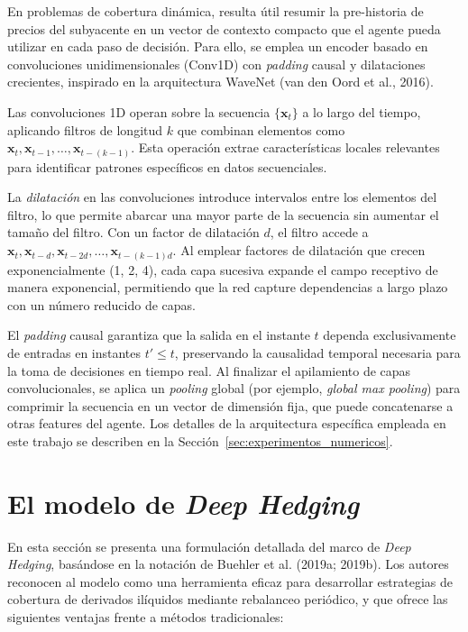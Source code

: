 \documentclass[11pt,a4paper,spanish]{article}
\numberwithin{equation}{section} %
\begin{document}
En problemas de cobertura dinámica, resulta útil resumir la pre-historia de precios del subyacente en un vector de contexto compacto que el agente pueda utilizar en cada paso de decisión. Para ello, se emplea un encoder basado en convoluciones unidimensionales (Conv1D) con \textit{padding} causal y dilataciones crecientes, inspirado en la arquitectura WaveNet (van den Oord et al., 2016).

Las convoluciones 1D operan sobre la secuencia \(\{\mathbf{x}_t\}\) a lo largo del tiempo, aplicando filtros de longitud \(k\) que combinan elementos como \(\mathbf{x}_t, \mathbf{x}_{t-1}, \dots,\allowbreak \mathbf{x}_{t-(k-1)}\). Esta operación extrae características locales relevantes para identificar patrones específicos en datos secuenciales.

La \emph{dilatación} en las convoluciones introduce intervalos entre los elementos del filtro, lo que permite abarcar una mayor parte de la secuencia sin aumentar el tamaño del filtro. Con un factor de dilatación \(d\), el filtro accede a \(\mathbf{x}_t, \mathbf{x}_{t-d}, \mathbf{x}_{t-2d}, \dots, \mathbf{x}_{t-(k-1)d}\). Al emplear factores de dilatación que crecen exponencialmente (1, 2, 4), cada capa sucesiva expande el campo receptivo de manera exponencial, permitiendo que la red capture dependencias a largo plazo con un número reducido de capas.

El \textit{padding} causal garantiza que la salida en el instante $t$ dependa exclusivamente de entradas en instantes $t' \leq t$, preservando la causalidad temporal necesaria para la toma de decisiones en tiempo real. Al finalizar el apilamiento de capas convolucionales, se aplica un \textit{pooling} global (por ejemplo, \textit{global max pooling}) para comprimir la secuencia en un vector de dimensión fija, que puede concatenarse a otras features del agente. Los detalles de la arquitectura específica empleada en este trabajo se describen en la Sección~\ref{sec:experimentos_numericos}.

\newpage


\section{El modelo de \textit{Deep Hedging}}\label{sec:deep_hedging}

En esta sección se presenta una formulación detallada del marco de \textit{Deep Hedging}, basándose en la notación de Buehler et al. (2019a; 2019b). Los autores reconocen al modelo como una herramienta eficaz para desarrollar estrategias de cobertura de derivados ilíquidos mediante rebalanceo periódico, y que ofrece las siguientes ventajas frente a métodos tradicionales:
\end{document}
